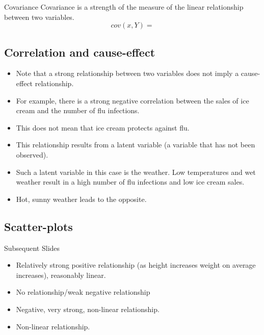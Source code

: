 %



{Covariance}
Covariance is a strength of the measure of the linear relationship between two variables.
\[ cov(x,Y) = \]




%








\subsection{Correlation and cause-effect}
\begin{itemize}
	\item Note that a strong relationship between two variables does not
	imply a cause-effect relationship.
	\item For example, there is a strong negative correlation between the
	sales of ice cream and the number of flu infections.
	\item This does not mean that ice cream protects against flu.
	\item This relationship results from a latent variable (a variable that has
	not been observed).
	\item Such a latent variable in this case is the weather. Low
	temperatures and wet weather result in a high number of flu
	infections and low ice cream sales. \item Hot, sunny weather leads to the
	opposite.
\end{itemize}





\subsection{Scatter-plots}
Subsequent Slides
\begin{itemize}
	\item Relatively strong positive relationship (as height increases
	weight on average increases), reasonably linear.
	\item No relationship/weak negative relationship
	\item Negative, very strong, non-linear relationship.
	\item Non-linear relationship.
\end{itemize}






